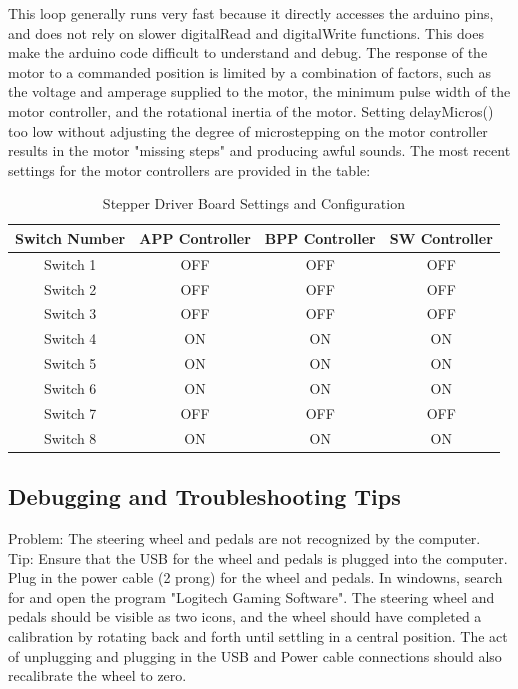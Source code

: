 \documentclass[12pt,oneside,letterpaper]{article}
\begin{document}
This loop generally runs very fast because it directly accesses the arduino pins, and does not rely on slower digitalRead and digitalWrite functions. This does make the arduino code difficult to understand and debug. The response of the motor to a commanded position is limited by a combination of factors, such as the voltage and amperage supplied to the motor, the minimum pulse width of the motor controller, and the rotational inertia of the motor. Setting delayMicros() too low without adjusting the degree of microstepping on the motor controller results in the motor "missing steps" and producing awful sounds. The most recent settings for the motor controllers are provided in the table: 

\begin{table}[h]
\centering
 \begin{tabular}{| c | c | c | c|}
 \hline
 Switch Number & APP Controller & BPP Controller & SW Controller \\
 \hline 
 Switch 1 & OFF & OFF  & OFF \\
 Switch 2 & OFF & OFF & OFF \\
 Switch 3 & OFF & OFF & OFF \\
 Switch 4 & ON & ON & ON \\
 Switch 5 & ON & ON & ON \\
 Switch 6 & ON & ON & ON \\
 Switch 7 & OFF& OFF & OFF \\
 Switch 8 & ON & ON & ON \\

 \hline
 \end{tabular}
 \caption{Stepper Driver Board Settings and Configuration}
 \label{table:StepperSettings}
\end{table}

\label{table: Most Recent Settings for Motor Controllers}

\subsection{Debugging and Troubleshooting Tips}

Problem: The steering wheel and pedals are not recognized by the computer. \\
Tip: Ensure that the USB for the wheel and pedals is plugged into the computer. Plug in the power cable (2 prong) for the wheel and pedals. In windowns, search for and open the program "Logitech Gaming Software". The steering wheel and pedals should be visible as two icons, and the wheel should have completed a calibration by rotating back and forth until settling in a central position. The act of unplugging and plugging in the USB and Power cable connections should also recalibrate the wheel to zero. \label{poi:Calibration} \\
\end{document}
